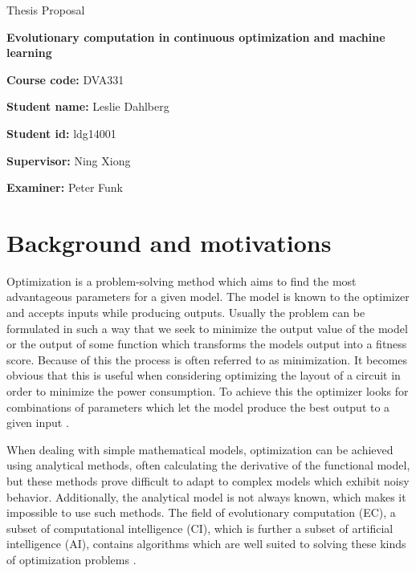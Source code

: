 \documentclass[12pt, titlepage, a4paper]{article}
\begin{document}
\begin{center}
  \LARGE
  Thesis Proposal

  \LARGE
  \textbf{Evolutionary computation in continuous optimization and machine learning}

\end{center}

\vspace{1cm}

\large
\noindent
\textbf{Course code:} DVA331

\large
\noindent
\textbf{Student name:} Leslie Dahlberg

\large
\noindent
\textbf{Student id:} ldg14001

\large
\noindent
\textbf{Supervisor:} Ning Xiong

\large
\noindent
\textbf{Examiner:} Peter Funk

\normalsize


\section{Background and motivations}

Optimization is a problem-solving method which aims to find the most advantageous parameters for a given model. The model is known to the optimizer and accepts inputs while producing outputs. Usually the problem can be formulated in such a way that we seek to minimize the output value of the model or the output of some function which transforms the models output into a fitness score. Because of this the process is often referred to as minimization. It becomes obvious that this is useful when considering optimizing the layout of a circuit in order to minimize the power consumption. To achieve this the optimizer looks for combinations of parameters which let the model produce the best output to a given input \cite{Eiben2015_origins}.


When dealing with simple mathematical models, optimization can be achieved using analytical methods, often calculating the derivative of the functional model, but these methods prove difficult to adapt to complex models which exhibit noisy behavior. Additionally, the analytical model is not always known, which makes it impossible to use such methods. The field of evolutionary computation (EC), a subset of computational intelligence (CI), which is further a subset of artificial intelligence (AI), contains algorithms which are well suited to solving these kinds of optimization problems \cite{Michalewicz1997,zhang2015comprehensive}.
\end{document}
